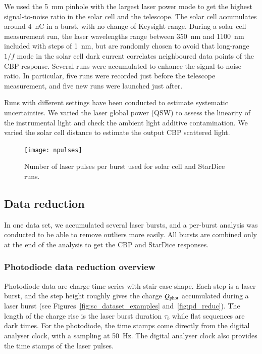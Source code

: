 We used the \SI{5}{\mm} pinhole with the largest laser power mode to get the highest signal-to-noise ratio in the solar cell and the \SD telescope. The solar cell accumulates around \SI{4}{\nano\coulomb} in a burst, with no change of Keysight range. %
During a solar cell measurement run, the laser wavelengths range between \SI{350}{\nano\meter} and \SI{1100}{\nano\meter} included with steps of \SI{1}{\nm}, but are randomly chosen to avoid that long-range $ 1/f$ mode in the solar cell dark current correlates neighboured data points of the CBP response. Several runs were accumulated to enhance the signal-to-noise ratio. In particular, five runs were recorded just before the \SD telescope measurement, and five new runs were launched just after.

Runs with different settings have been conducted to estimate systematic uncertainties. We varied the laser global power (QSW) to assess the linearity of the instrumental light and check the ambient light additive contamination. We varied the solar cell distance to estimate the output CBP scattered light.

\begin{figure}[!h]
\centering
\texttt{[image: npulses]}
\caption{Number of laser pulses per burst used for solar cell and StarDice runs.}\label{fig:npulses}
\end{figure}


\subsection{Data reduction}


In one data set, we accumulated several laser bursts, and a per-burst analysis was conducted to be able to remove outliers more easily. All bursts are combined only at the end of the analysis to get the CBP and StarDice responses.

\subsubsection{Photodiode data reduction overview}
\label{sec:pd_reduction}

Photodiode data are charge time series with stair-case shape. Each step is a laser burst, and the step height roughly gives the charge $Q_{\mathrm{phot}}$ accumulated during a laser burst (see Figures~\ref{fig:sc_dataset_examples} and~\ref{fig:pd_reduc}). The length of the charge rise is the laser burst duration $\tau_b$ while flat sequences are dark times. For the photodiode, the time stamps come directly from the digital analyser clock, with a sampling at \SI{50}{\hertz}. The digital analyser clock also provides the time stamps of the laser pulses. 


